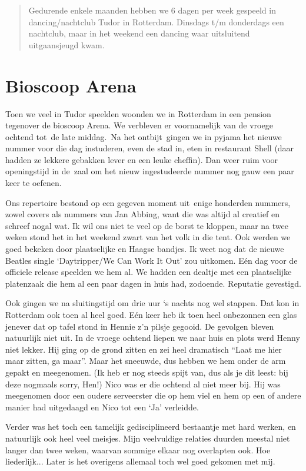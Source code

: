 \documentclass[10pt,twoside, openright]{memoir}
\begin{document}
\begin{quote}
Gedurende enkele maanden hebben we 6 dagen per week gespeeld in dancing/nachtclub Tudor in Rotterdam. Dinsdags t/m donderdags een nachtclub, maar in het weekend een dancing waar uitsluitend uitgaansjeugd kwam.
\end{quote} 


\chapter{Bioscoop Arena} %
\label{cha:arena}

Toen we veel in Tudor speelden woonden we in Rotterdam in een pension tegenover de bioscoop Arena. We verbleven er voornamelijk van de vroege ochtend tot de late middag. Na het ontbijt gingen we in pyjama het nieuwe nummer voor die dag instuderen, even de stad in, eten in restaurant Shell (daar hadden ze lekkere gebakken lever en een leuke cheffin). Dan weer ruim voor openingstijd in de zaal om het nieuw ingestudeerde nummer nog gauw een paar keer te oefenen. 

Ons repertoire bestond op een gegeven moment uit enige honderden nummers, zowel covers als nummers van Jan Abbing, want die was altijd al creatief en schreef nogal wat. Ik wil ons niet te veel op de borst te kloppen, maar na twee weken stond het in het weekend zwart van het volk in die tent. Ook werden we goed bekeken door plaatselijke en Haagse bandjes. Ik weet nog dat de nieuwe Beatles single `Daytripper/We Can Work It Out' zou uitkomen. Eén dag voor de officiele release speelden we hem al. We hadden een dealtje met een plaatselijke platenzaak die hem al een paar dagen in huis had, zodoende. Reputatie gevestigd. 

Ook gingen we na sluitingstijd om drie uur `s nachts nog wel stappen. Dat kon in Rotterdam ook toen al heel goed. Eén keer heb ik toen heel onbezonnen een glas jenever dat op tafel stond in Hennie z'n pilsje gegooid. De gevolgen bleven natuurlijk niet uit. In de vroege ochtend liepen we naar huis en plots werd Henny niet lekker. Hij ging op de grond zitten en zei heel dramatisch ``Laat me hier maar zitten, ga maar''. Maar het sneeuwde, dus hebben we hem onder de arm gepakt en meegenomen. (Ik heb er nog steeds spijt van, dus als je dit leest: bij deze nogmaals sorry, Hen!) Nico was er die ochtend al niet meer bij. Hij was meegenomen door een oudere serveerster die op hem viel en hem op een of andere manier had uitgedaagd en Nico tot een `Ja' verleidde.

Verder was het toch een tamelijk gedisciplineerd bestaantje met hard werken, en natuurlijk ook heel veel meisjes. Mijn veelvuldige relaties duurden meestal niet langer dan twee weken, waarvan sommige elkaar nog overlapten ook. Hoe liederlijk... Later is het overigens allemaal toch wel goed gekomen met mij. 
\end{document}
